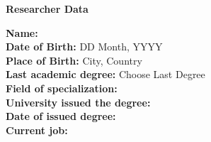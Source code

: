 \cleardoublepage
\newpage
\thispagestyle{empty}

\begin{center}\huge \textbf{Researcher Data}\end{center}
\vspace{3em}
\begin{flushleft}
\textbf{Name:} \\

\textbf{Date of Birth:} DD Month, YYYY \\

\textbf{Place of Birth:} City, Country \\

\textbf{Last academic degree:} Choose Last Degree \\

\textbf{Field of specialization:}  \\

\textbf{University issued the degree:}  \\

\textbf{Date of issued degree:}  \\


\textbf{Current job:}  \\

\end{flushleft}
\vfill






